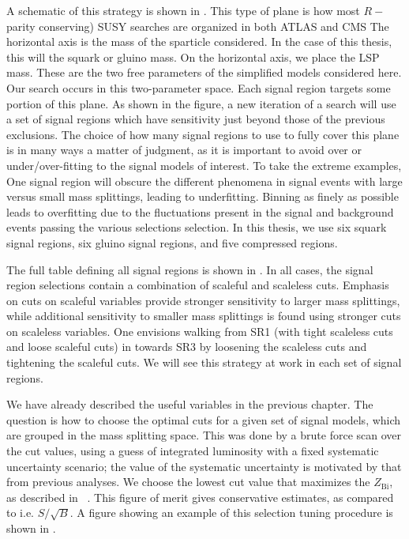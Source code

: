 A schematic of this strategy is shown in .
This type of plane is how most $R-$parity conserving) SUSY searches are organized in both ATLAS and CMS
The horizontal axis is the mass of the sparticle considered.
In the case of this thesis, this will the squark or gluino mass.
On the horizontal axis, we place the LSP mass.
These are the two free parameters of the simplified models considered here.
Our search occurs in this two-parameter space.
Each signal region targets some portion of this plane.
As shown in the figure, a new iteration of a search will use a set of signal regions which have sensitivity just beyond those of the previous exclusions.
The choice of how many signal regions to use to fully cover this plane is in many ways a matter of judgment, as it is important to avoid over or under/over-fitting to the signal models of interest.
To take the extreme examples, One signal region will obscure the different phenomena in signal events with large versus small mass splittings, leading to underfitting.
Binning as finely as possible\footnotemark~ leads to overfitting due to the fluctuations present in the signal and background events passing the various selections selection.
In this thesis, we use six squark signal regions, six gluino signal regions, and five compressed regions.

The full table defining all signal regions is shown in .
In all cases, the signal region selections contain a combination of scaleful and scaleless cuts.
Emphasis on cuts on scaleful variables provide stronger sensitivity to larger mass splittings, while additional sensitivity to smaller mass splittings is found using stronger cuts on scaleless variables.
One envisions walking from SR1 (with tight scaleless cuts and loose scaleful cuts) in  towards SR3 by loosening the scaleless cuts and tightening the scaleful cuts.
We will see this strategy at work in each set of signal regions.

We have already described the useful variables in the previous chapter.
The question is how to choose the optimal cuts for a given set of signal models, which are grouped in the mass splitting space.
This was done by a brute force scan over the cut values, using a guess of integrated luminosity with a fixed systematic uncertainty scenario; the value of the systematic uncertainty is motivated by that from previous analyses.
We choose the lowest cut value that maximizes the $Z_{\text{Bi}}$, as described in ~\cite{Cousins:2008zz}.
This figure of merit gives conservative estimates, as compared to i.e. $S/\sqrt{B}$.
A figure showing an example of this selection tuning procedure is shown in .

